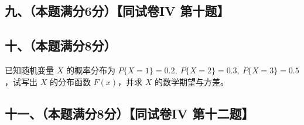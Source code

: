 \documentclass[UTF8,12pt]{ctexart}
\begin{document}
\subsection*{九、（本题满分6分）【同试卷IV 第十题】}

\subsection*{十、（本题满分8分）}

已知随机变量 \(\displaystyle X\) 的概率分布为 \(\displaystyle P\{X=1\}=0.2,\allowbreak \ P\{X=2\}=0.3,\allowbreak \ P\{X=3\}=0.5\)，试写出 \(\displaystyle X\) 的分布函数 \(\displaystyle F(x)\)，并求 \(\displaystyle X\) 的数学期望与方差。


\subsection*{十一、（本题满分8分）【同试卷IV 第十二题】}
\end{document}
